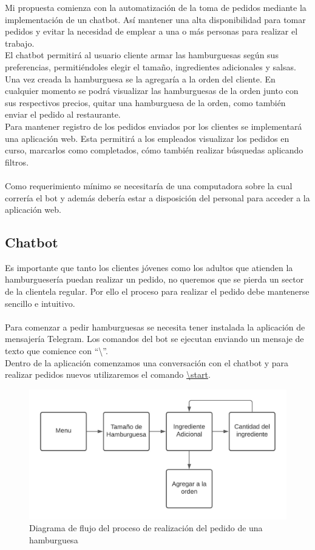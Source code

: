 \documentclass[a4paper,12pt]{article}
\begin{document}
Mi propuesta comienza con la automatización de la toma de pedidos mediante la implementación de un chatbot. Así mantener una alta disponibilidad para tomar pedidos y evitar la necesidad de emplear a una o más personas para realizar el trabajo.
\\
El chatbot permitirá al usuario cliente armar las hamburguesas según sus preferencias, permitiéndoles elegir el tamaño, ingredientes adicionales y salsas. Una vez creada la hamburguesa se la agregaría a la orden del cliente. En cualquier momento se podrá visualizar las hamburguesas de la orden junto con sus respectivos precios,  quitar una hamburguesa de la orden, como también enviar el pedido al restaurante. 
\\
Para mantener registro de los pedidos enviados por los clientes se implementará una aplicación web. Esta permitirá a los empleados visualizar los pedidos en curso, marcarlos como completados, cómo también realizar búsquedas aplicando filtros. 
\\\\
Como requerimiento mínimo se necesitaría de una computadora sobre la cual correría el bot y además debería estar a disposición del personal para acceder a la aplicación web.

\pagebreak

\subsection{Chatbot}
Es importante que tanto los clientes jóvenes como los adultos que atienden la hamburguesería puedan realizar un pedido, no queremos que se pierda un sector de la clientela regular. Por ello el proceso para realizar el pedido debe mantenerse sencillo e intuitivo.
\\\\
Para comenzar a pedir hamburguesas se necesita tener instalada la aplicación de mensajería Telegram. Los comandos del bot se ejecutan enviando un mensaje de texto que comience con “\textbackslash”.
\\
Dentro de la aplicación comenzamos una conversación con el chatbot y para realizar pedidos nuevos utilizaremos el comando  \color{blue}\uline{\textbackslash start}\color{black}.
\begin{figure}[H]
	\centering
	\includegraphics[width=1.0\linewidth]{diagrama-flujo.jpeg}
	 \caption{Diagrama de flujo del proceso de realización del pedido de una hamburguesa}
	\label{fig:Diagrama de Flujo}
\end{figure}
\end{document}
